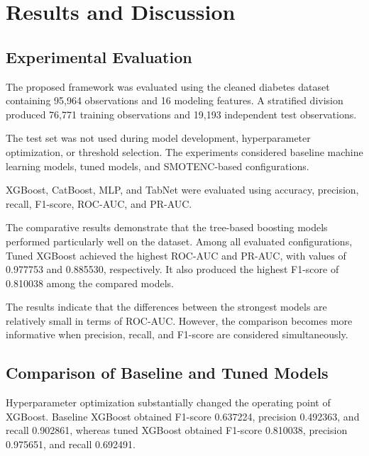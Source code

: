 \documentclass[conference]{IEEEtran}
\begin{document}
\section{Results and Discussion}

\subsection{Experimental Evaluation}

The proposed framework was evaluated using the cleaned diabetes dataset containing 95,964 observations and 16 modeling features. A stratified division produced 76,771 training observations and 19,193 independent test observations.

The test set was not used during model development, hyperparameter optimization, or threshold selection. The experiments considered baseline machine learning models, tuned models, and SMOTENC-based configurations.

XGBoost, CatBoost, MLP, and TabNet were evaluated using accuracy, precision, recall, F1-score, ROC-AUC, and PR-AUC.

The comparative results demonstrate that the tree-based boosting models performed particularly well on the dataset. Among all evaluated configurations, Tuned XGBoost achieved the highest ROC-AUC and PR-AUC, with values of 0.977753 and 0.885530, respectively. It also produced the highest F1-score of 0.810038 among the compared models.

The results indicate that the differences between the strongest models are relatively small in terms of ROC-AUC. However, the comparison becomes more informative when precision, recall, and F1-score are considered simultaneously.

\subsection{Comparison of Baseline and Tuned Models}

Hyperparameter optimization substantially changed the operating point of XGBoost. Baseline XGBoost obtained F1-score 0.637224, precision 0.492363, and recall 0.902861, whereas tuned XGBoost obtained F1-score 0.810038, precision 0.975651, and recall 0.692491.
\end{document}
